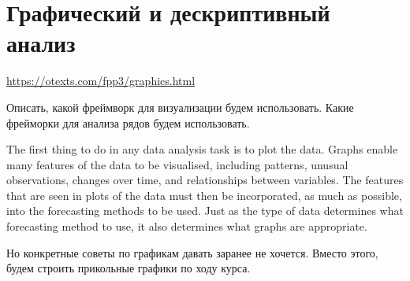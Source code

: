 \section{Графический и дескриптивный анализ}
\url{https://otexts.com/fpp3/graphics.html}

Описать, какой фреймворк для визуализации будем использовать.
Какие фрейморки для анализа рядов будем использовать.

The first thing to do in any data analysis task is to plot the data.
Graphs enable many features of the data to be visualised, including
patterns, unusual observations, changes over time, and relationships
between variables. The features that are seen in plots of the data
must then be incorporated, as much as possible, into the forecasting
methods to be used. Just as the type of data determines what
forecasting method to use, it also determines what graphs are appropriate.

Но конкретные советы по графикам давать заранее не хочется. Вместо
этого, будем строить прикольные графики по ходу курса.